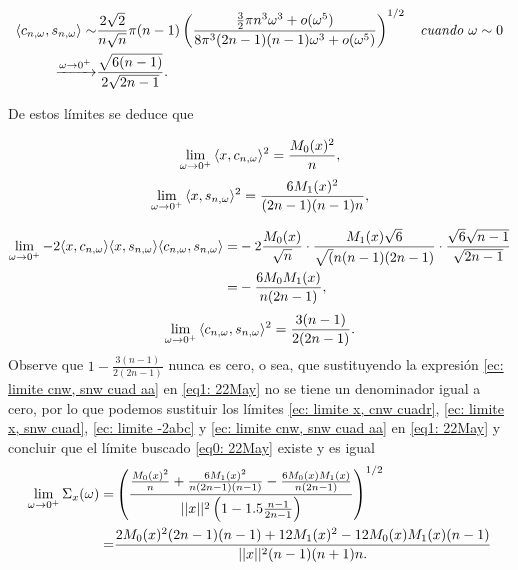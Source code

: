 \begin{align*}
\langle
c_{n, \omega}, s_{n, \omega}
\rangle \sim & 
\frac{2 \sqrt{2}}{n \sqrt{n}} \pi (n-1)
\left(
\frac{
\frac{3}{2} \pi n^{3}\omega^{3} + o(\omega^{5})
}{
8 \pi^{3}(2n-1)(n-1)\omega^{3} + o(\omega^{5})
}
\right)^{1/2} 
\hspace{0.2cm} \textit{ cuando } \omega \sim 0
\\
\xrightarrow{\omega \rightarrow 0^{+}} & \frac{
\sqrt{6(n-1)}
}{2 \sqrt{2n-1}}.
\end{align*} 

De estos límites se deduce que 

\begin{equation}
\label{ec: limite x, cnw cuadr}
\lim\limits_{\omega \rightarrow 0^{+}}{\langle
x, c_{n, \omega}
\rangle^{2} }
= \frac{M_{0}(x)^{2}}{n},
\end{equation}
\begin{equation}
\label{ec: limite x, snw cuad}
\lim\limits_{\omega \rightarrow 0^{+}}{\langle
x, s_{n, \omega}
\rangle^{2} }
= \frac{6M_{1}(x)^{2}}{(2n-1)(n-1)n},
\end{equation}

\begin{align}
\label{ec: limite -2abc}
\lim\limits_{\omega \rightarrow 0^{+}}{
-2 \langle x, c_{n, \omega} \rangle
\langle x, s_{n, \omega} \rangle
\langle c_{n, \omega}, s_{n, \omega} \rangle} = &
-2 
\frac{M_{0}(x)}{\sqrt{n}} \cdot 
\frac{M_{1}(x) \sqrt{6}}{\sqrt(n(n-1)(2n-1)} \cdot
\frac{\sqrt{6} \sqrt{n-1}}{\sqrt{2n-1}} \nonumber \\
= &
-\frac{6 M_{0}M_{1}(x)}{n(2n-1)},
\end{align}
\begin{equation}
\label{ec: limite cnw, snw cuad aa}
\lim\limits_{\omega \rightarrow 0^{+}}{\langle
c_{n, \omega}, s_{n, \omega}
\rangle^{2} }
= \frac{3(n-1)}{2(2n-1)}.
\end{equation}
Observe que $1-\frac{3(n-1)}{2(2n-1)}$
nunca es cero, o sea, que sustituyendo la 
expresión \eqref{ec: limite cnw, snw cuad aa}
en 
\eqref{eq1: 22May}
no se tiene un denominador igual a cero, por lo que podemos
sustituir los límites
\eqref{ec: limite x, cnw cuadr},
\eqref{ec: limite x, snw cuad},
\eqref{ec: limite -2abc} y
\eqref{ec: limite cnw, snw cuad aa}
en \eqref{eq1: 22May}
y concluir que el límite buscado
\eqref{eq0: 22May} existe y es igual
\begin{align*}
\lim\limits_{\omega \rightarrow 0^{+}}{\Sigma_{x}(\omega)}
= & 
\left(
\frac{
\frac{M_{0}(x)^{2}}{n} + \frac{6M_{1}(x)^{2}}{n(2n-1)(n-1)}
- \frac{6 M_{0}(x) M_{1}(x)}{n(2n-1)}
}{
||x||^{2} \left(
1- 1.5 \frac{n-1}{2n-1}
\right)
}
\right)^{1/2} \\
= &
\frac{
2M_{0}(x)^{2}(2n-1)(n-1) + 12M_{1}(x)^{2} - 12M_{0}(x)M_{1}(x)(n-1)
}{
||x||^{2} (n-1)(n+1)n.
}
\end{align*}



